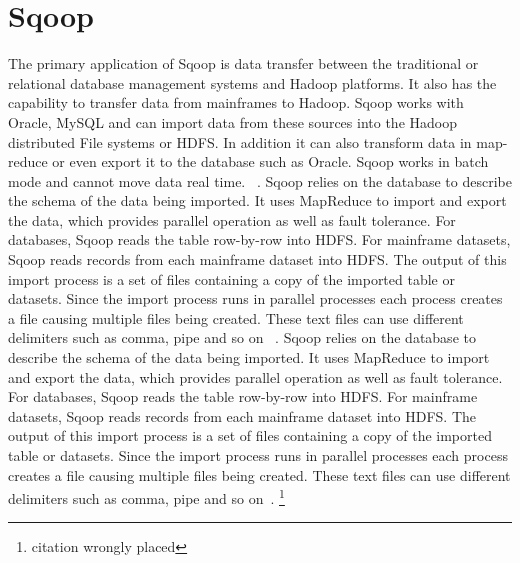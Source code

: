 \section{Sqoop}

The primary application of Sqoop is data transfer between the
traditional or relational database management systems and Hadoop
platforms. It also has the capability to transfer data from mainframes
to Hadoop. Sqoop works with Oracle, MySQL and can import data from
these sources into the Hadoop distributed File systems or HDFS. In
addition it can also transform data in map-reduce or even export it to
the database such as Oracle.  Sqoop works in batch mode and cannot
move data real time.  ~\cite{hid-sp18-517-Sqoop}. Sqoop relies on the
database to describe the schema of the data being imported. It uses
MapReduce to import and export the data, which provides parallel
operation as well as fault tolerance.  For databases, Sqoop reads the
table row-by-row into HDFS.  For mainframe datasets, Sqoop reads
records from each mainframe dataset into HDFS. The output of this
import process is a set of files containing a copy of the imported
table or datasets. Since the import process runs in parallel processes
each process creates a file causing multiple files being
created. These text files can use different delimiters such as comma,
pipe and so on ~\cite{hid-sp18-517-Sqoop}. Sqoop relies on the
database to describe the schema of the data being imported. It uses
MapReduce to import and export the data, which provides parallel
operation as well as fault tolerance.  For databases, Sqoop reads the
table row-by-row into HDFS.  For mainframe datasets, Sqoop reads
records from each mainframe dataset into HDFS. The output of this
import process is a set of files containing a copy of the imported
table or datasets. Since the import process runs in parallel processes
each process creates a file causing multiple files being
created. These text files can use different delimiters such as comma,
pipe and so on~\cite{hid-sp18-517-Sqoop}.
\footnote{citation wrongly placed}


